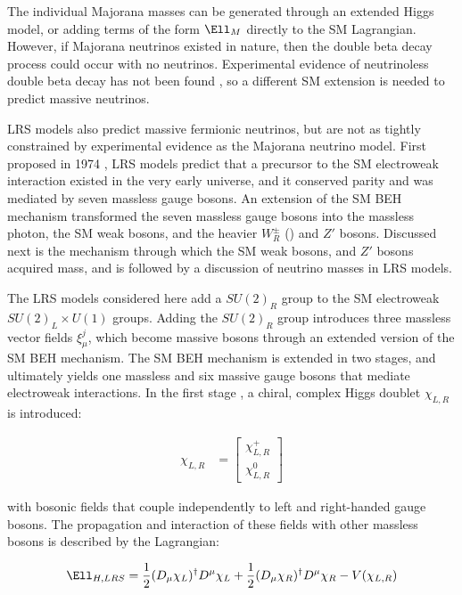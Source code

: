 The individual Majorana masses can be generated through an extended Higgs model, or adding terms of the 
form $\Ell_{M}$ directly to the SM Lagrangian.  However, if Majorana neutrinos existed in nature, then 
the double beta decay process could occur with no neutrinos.  Experimental evidence of neutrinoless double 
beta decay has not been found \cite{igexDblBetaDecay,gerdaDblBetaDecay}, so a different SM extension is 
needed to predict massive neutrinos.

LRS models also predict massive fermionic neutrinos, but are not as tightly constrained by experimental 
evidence as the Majorana neutrino model.
First proposed in 1974 \cite{earlyLRSModel}, LRS models predict that a precursor to the SM electroweak 
interaction existed in the very early universe, and it conserved parity and was mediated by seven massless 
gauge bosons.  An extension of the SM BEH mechanism transformed the seven massless gauge bosons 
into the massless photon, the SM weak bosons, and the heavier $W^{\pm}_{R}$ (\WR) and $Z'$ bosons.  
Discussed next is the mechanism through which the SM weak bosons, \WR and $Z'$ bosons acquired mass, 
and is followed by a discussion of neutrino masses in LRS models.

The LRS models considered here add a $SU(2)_{R}$ group to the SM electroweak $SU(2)_{L} \times U(1)$ groups.
Adding the $SU(2)_{R}$ group introduces three massless vector fields $\xi^{j}_{\mu}$, which become massive 
bosons through an extended version of the SM BEH mechanism.  The SM BEH mechanism is extended in two stages, 
and ultimately yields one massless and six massive gauge bosons that mediate electroweak interactions.  In 
the first stage \cite{lrsHiggsStageOne}, a chiral, complex Higgs doublet $\chi_{L,R}$ is introduced: 

\begin{align}
	\chi_{L,R} &= \begin{bmatrix}
	\chi^{+}_{L,R} \\
	\chi^{0}_{L,R}
	\end{bmatrix}
	\label{eq:stageOneVEV}
\end{align}

with bosonic fields that couple independently to left and right-handed gauge bosons.  The propagation and 
interaction of these fields with other massless bosons is described by the Lagrangian:

\begin{equation}
	\Ell_{H,LRS} = \frac{1}{2}(D_{\mu}\chi_{L})^{\dagger}D^{\mu}\chi_{L} + \frac{1}{2}(D_{\mu}\chi_{R})^{\dagger}D^{\mu}\chi_{R} - V(\chi_{L,R})
\end{equation}

